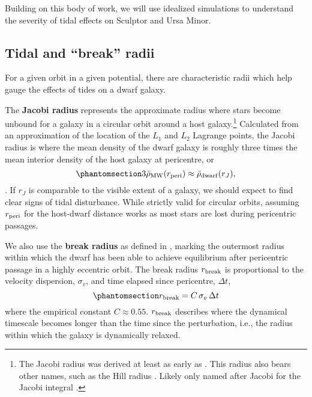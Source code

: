Building on this body of work, we will use idealized simulations to
understand the severity of tidal effects on Sculptor and Ursa Minor.

\subsection{Tidal and ``break'' radii}\label{sec:break_radii}

For a given orbit in a given potential, there are characteristic radii
which help gauge the effects of tides on a dwarf galaxy.

The \textbf{Jacobi radius} represents the approximate radius where stars
become unbound for a galaxy in a circular orbit around a host
galaxy.\footnote{The Jacobi radius was derived at least as early as
  \citet{laplace1798}. This radius also bears other names, such as the
  Hill radius \citep[from][]{hill1878}. Likely only named after Jacobi
  for the Jacobi integral \citep{jacobi1836}.} Calculated from an
approximation of the location of the \(L_1\) and \(L_2\) Lagrange
points, the Jacobi radius is where the mean density of the dwarf galaxy
is roughly three times the mean interior density of the host galaxy at
pericentre, or
\begin{equation}\protect\phantomsection\label{eq:r_jacobi}{
3\bar \rho_{\rm MW}(r_{\rm peri}) \approx \bar \rho_{\rm dwarf}(r_J),
}\end{equation} \citep[ eq. 7-84]{BT1987}. If \(r_J\) is comparable to
the visible extent of a galaxy, we should expect to find clear signs of
tidal disturbance. While strictly valid for circular orbits, assuming
\(r_{\rm peri}\) for the host-dwarf distance works as most stars are
lost during pericentric passages.

We also use the \textbf{break radius} as defined in
\citet{penarrubia+2009}, marking the outermost radius within which the
dwarf has been able to achieve equilibrium after pericentric passage in
a highly eccentric orbit. The break radius \(r_{\rm break}\) is
proportional to the velocity dispersion, \(\sigma_v\), and time elapsed
since pericentre, \(\Delta t\),
\begin{equation}\protect\phantomsection\label{eq:r_break}{
r_{\rm break} = C\,\sigma_{v}\,\Delta t
}\end{equation} where the empirical constant \(C \approx 0.55\).
\(r_{\rm break}\) describes where the dynamical timescale becomes longer
than the time since the perturbation, i.e., the radius within which the
galaxy is dynamically relaxed.

